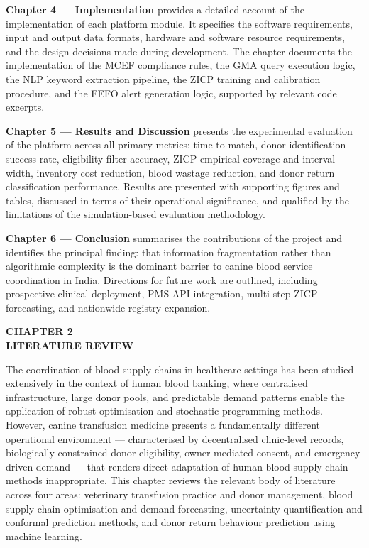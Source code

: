 \documentclass[12pt,a4paper]{article}
\begin{document}
\vspace{0.6em}
\noindent \textbf{Chapter 4 — Implementation} provides a detailed account of the implementation of each platform module. It specifies the software requirements, input and output data formats, hardware and software resource requirements, and the design decisions made during development. The chapter documents the implementation of the MCEF compliance rules, the GMA query execution logic, the NLP keyword extraction pipeline, the ZICP training and calibration procedure, and the FEFO alert generation logic, supported by relevant code excerpts.

\vspace{0.6em}
\noindent \textbf{Chapter 5 — Results and Discussion} presents the experimental evaluation of the platform across all primary metrics: time-to-match, donor identification success rate, eligibility filter accuracy, ZICP empirical coverage and interval width, inventory cost reduction, blood wastage reduction, and donor return classification performance. Results are presented with supporting figures and tables, discussed in terms of their operational significance, and qualified by the limitations of the simulation-based evaluation methodology.

\vspace{0.6em}
\noindent \textbf{Chapter 6 — Conclusion} summarises the contributions of the project and identifies the principal finding: that information fragmentation rather than algorithmic complexity is the dominant barrier to canine blood service coordination in India. Directions for future work are outlined, including prospective clinical deployment, PMS API integration, multi-step ZICP forecasting, and nationwide registry expansion.

\newpage
\begin{center}
    \textbf{\large CHAPTER 2}\\[0.4em]
    \textbf{\large LITERATURE REVIEW}
\end{center}
\vspace{1.5em}

\noindent The coordination of blood supply chains in healthcare settings has been studied extensively in the context of human blood banking, where centralised infrastructure, large donor pools, and predictable demand patterns enable the application of robust optimisation and stochastic programming methods. However, canine transfusion medicine presents a fundamentally different operational environment — characterised by decentralised clinic-level records, biologically constrained donor eligibility, owner-mediated consent, and emergency-driven demand — that renders direct adaptation of human blood supply chain methods inappropriate. This chapter reviews the relevant body of literature across four areas: veterinary transfusion practice and donor management, blood supply chain optimisation and demand forecasting, uncertainty quantification and conformal prediction methods, and donor return behaviour prediction using machine learning.
\end{document}
